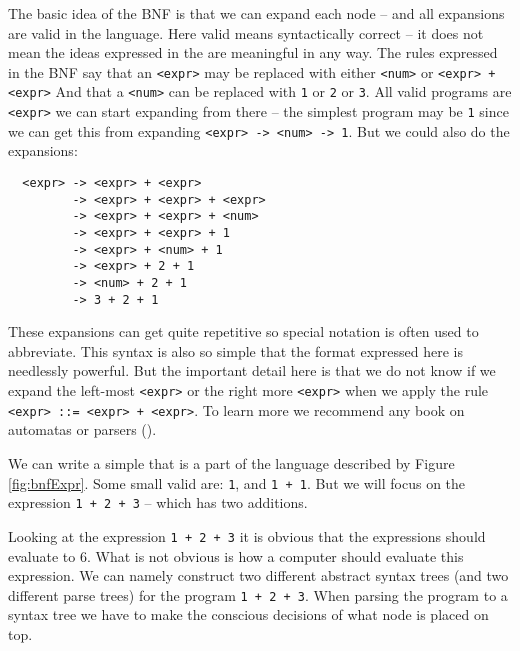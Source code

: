The basic idea of the BNF is that we can expand each node -- and all expansions are valid  in the language. Here valid means syntactically correct -- it does not mean the ideas expressed in the  are meaningful in any way. The rules expressed in the BNF say that an \verb|<expr>| may be replaced with either \verb|<num>| or \verb|<expr> + <expr>| And that a \verb|<num>| can be replaced with \verb|1| or \verb|2| or \verb|3|. All valid programs are \verb|<expr>| we can start expanding from there -- the simplest program may be \verb|1| since we can get this from expanding \verb|<expr> -> <num> -> 1|. But we could also do the expansions:
\begin{verbatim}
  <expr> -> <expr> + <expr>
         -> <expr> + <expr> + <expr>
         -> <expr> + <expr> + <num>
         -> <expr> + <expr> + 1
         -> <expr> + <num> + 1
         -> <expr> + 2 + 1
         -> <num> + 2 + 1
         -> 3 + 2 + 1
\end{verbatim}
These expansions can get quite repetitive so special notation is often used to abbreviate. This syntax is also so simple that the format expressed here is needlessly powerful. But the important detail here is that we do not know if we expand the left-most \verb|<expr>| or the right more \verb|<expr>| when we apply the rule \verb|<expr> ::= <expr> + <expr>|. To learn more we recommend any book on automatas or parsers (\cite{src:DragonBook}). 

We can write a simple  that is a part of the language described by Figure \ref{fig:bnfExpr}. Some small valid  are: \verb!1!, and \verb!1 + 1!. But we will focus on the expression \verb!1 + 2 + 3! -- which has two additions.

Looking at the expression \verb!1 + 2 + 3! it is obvious that the expressions should evaluate to 6. What is not obvious is how a computer should evaluate this expression. We can namely construct two different abstract syntax trees (and two different parse trees) for the program \verb!1 + 2 + 3!. When parsing the program to a syntax tree we have to make the conscious decisions of what node is placed on top.


